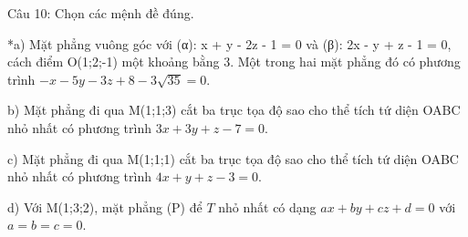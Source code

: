 \documentclass[a4paper,12pt]{article}
\begin{document}
Câu 10: Chọn các mệnh đề đúng.

*a) Mặt phẳng vuông góc với (α): x + y - 2z - 1 = 0 và (β): 2x - y + z - 1 = 0, cách điểm O(1;2;-1) một khoảng bằng 3. Một trong hai mặt phẳng đó có phương trình \(-x - 5y - 3z + 8 - 3\sqrt{35} = 0\).

b) Mặt phẳng đi qua M(1;1;3) cắt ba trục tọa độ sao cho thể tích tứ diện OABC nhỏ nhất có phương trình \(3x + 3y + z - 7 = 0\).

c) Mặt phẳng đi qua M(1;1;1) cắt ba trục tọa độ sao cho thể tích tứ diện OABC nhỏ nhất có phương trình \(4x + y + z - 3 = 0\).

d) Với M(1;3;2), mặt phẳng (P) để \(T\) nhỏ nhất có dạng \(ax+by+cz+d=0\) với \(a=b=c=0\).
\end{document}
